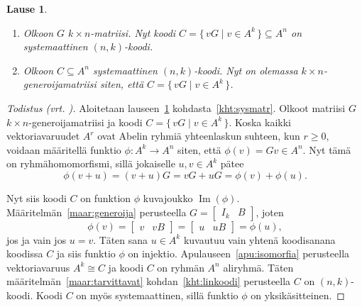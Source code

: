 \documentclass[a4paper,12pt,leqno,oneside]{report} %
\theoremstyle{plain}
\newtheorem{lause}{Lause}[chapter]
\theoremstyle{plain}
\theoremstyle{definition}
\DeclareMathOperator{\im}{Im}
\theoremstyle{remark}
\numberwithin{equation}{chapter}
\begin{document}
    \begin{lause}\label{lause:systemaattinen}
        \mbox{}
        \begin{enumerate}
            \item\label{kht:sysmatr} Olkoon $G$ $k \times n$-matriisi. Nyt koodi $C = \{\, vG \mid v \in A^k\,\} \subseteq A^n$ on systemaattinen $(n, k)$-koodi.
            \item\label{kht:sysgenmatr} Olkoon $C \subseteq A^n$ systemaattinen $(n, k)$-koodi. Nyt on olemassa $k \times n$-generoija\-matriisi siten, että $C = \{\, vG \mid v \in A^k\,\}$.
        \end{enumerate}
    \end{lause}

    \begin{proof}[Todistus \upshape(vrt. {\cite[s.~498]{PA}})]\label{tod:systemaattinen}
        Aloitetaan lauseen~\ref{lause:systemaattinen} kohdasta~\ref{kht:sysmatr}. Olkoot matriisi $G$ $k \times n$-generoijamatriisi ja koodi $C = \{\, vG \mid v \in A^k\,\}$. Koska kaikki vektoriavaruudet $A^r$ ovat Abelin ryhmiä yhteenlaskun suhteen, kun $r \ge 0$, voidaan määritellä funktio $\phi: A^k \rightarrow A^n$ siten, että $\phi(v) = Gv \in A^n$. Nyt tämä on ryhmähomomorfismi, sillä jokaiselle $u, v \in A^k$ pätee
        \[
            \phi(v + u) = (v + u)G = vG + uG = \phi(v) + \phi(u).
        \]

        Nyt siis koodi $C$ on funktion $\phi$ kuvajoukko $\im(\phi)$. Määritelmän~\ref{maar:generoija} perusteella
        $G = 
        \begin{bmatrix}
            I_k & B
        \end{bmatrix}$, joten
        \[
            \phi(v) =
            \begin{bmatrix}
                v & vB
            \end{bmatrix}
            =
            \begin{bmatrix}
                u & uB
            \end{bmatrix}
            = \phi(u),
        \]
        jos ja vain jos $u = v$. Täten sana $u \in A^k$ kuvautuu vain yhtenä koodisanana koodissa $C$ ja siis funktio $\phi$ on injektio. Apulauseen~\ref{apu:isomorfia} perusteella vektoriavaruus $A^k \cong C$ ja koodi $C$ on ryhmän $A^n$ aliryhmä. Täten määritelmän~\ref{maar:tarvittavat} kohdan~\ref{kht:linkoodi} perusteella $C$ on $(n, k)$-koodi. Koodi $C$ on myös systemaattinen, sillä funktio $\phi$ on yksikäsitteinen.


\end{proof}
\end{document}
